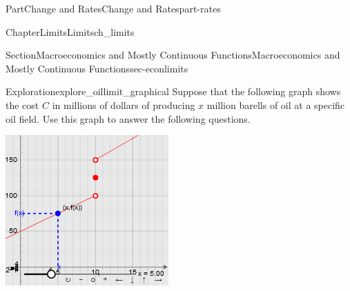 \documentclass[oneside,10pt,]{tufte-book}
\numberwithin{equation}{chapter}
\begin{document}
\begin{partptx}{Part}{Change and Rates}{}{Change and Rates}{}{}{part-rates}
\begin{chapterptx}{Chapter}{Limits}{}{Limits}{}{}{ch_limits}
\begin{sectionptx}{Section}{Macroeconomics and Mostly Continuous Functions}{}{Macroeconomics and Mostly Continuous Functions}{}{}{sec-econlimits}
\begin{exploration}{Exploration}{}{explore_oillimit_graphical}%
Suppose that the following graph shows the cost \(C\) in millions of dollars of producing \(x\) million barells of oil at a specific oil field. Use this graph to answer the following questions.%
\begin{sidebyside}{2}{0.075}{0.075}{0.17}%
\begin{sbspanel}{0.47}%
\includegraphics[width=\linewidth]{external/jsxgraph-figure_oillimit.png}
\end{sbspanel}%
\begin{sbspanel}{0.21}%

\end{sbspanel}
\end{sidebyside}
\end{exploration}
\end{sectionptx}
\end{chapterptx}
\end{partptx}
\end{document}
